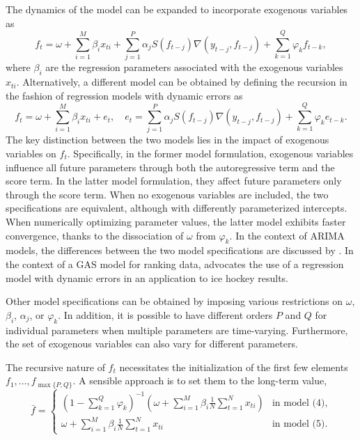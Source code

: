The dynamics of the model can be expanded to incorporate exogenous variables as
\begin{equation}
f_{t} = \omega + \sum_{i=1}^M \beta_i x_{ti} + \sum_{j=1}^P \alpha_j S(f_{t - j}) \nabla(y_{t - j}, f_{t - j}) + \sum_{k=1}^Q \varphi_k f_{t-k},
\label{eq:dynJoint}
\end{equation}
where \(\beta_i\) are the regression parameters associated with the exogenous variables \(x_{ti}\). Alternatively, a different model can be obtained by defining the recursion in the fashion of regression models with dynamic errors as
\begin{equation}
f_{t} = \omega + \sum_{i=1}^M \beta_i x_{ti} + e_{t}, \quad e_t = \sum_{j=1}^P \alpha_j S(f_{t - j}) \nabla(y_{t - j}, f_{t - j}) + \sum_{k=1}^Q \varphi_k e_{t-k}.
\label{eq:dynSep}
\end{equation}
The key distinction between the two models lies in the impact of exogenous variables on \(f_t\). Specifically, in the former model formulation, exogenous variables influence all future parameters through both the autoregressive term and the score term. In the latter model formulation, they affect future parameters only through the score term. When no exogenous variables are included, the two specifications are equivalent, although with differently parameterized intercepts. When numerically optimizing parameter values, the latter model exhibits faster convergence, thanks to the dissociation of \(\omega\) from \(\varphi_k\). In the context of ARIMA models, the differences between the two model specifications are discussed by \citet{Hyndman2010}. In the context of a GAS model for ranking data, \citet{Holy2025a} advocates the use of a regression model with dynamic errors in an application to ice hockey results.

Other model specifications can be obtained by imposing various restrictions on \(\omega\), \(\beta_i\), \(\alpha_j\), or \(\varphi_k\). In addition, it is possible to have different orders \(P\) and \(Q\) for individual parameters when multiple parameters are time-varying. Furthermore, the set of exogenous variables can also vary for different parameters.

The recursive nature of \(f_t\) necessitates the initialization of the first few elements \(f_1, \ldots, f_{\max\{P,Q\}}\). A sensible approach is to set them to the long-term value,
\begin{equation}
\bar{f} = \begin{cases}
\left(1 - \sum_{k=1}^Q \varphi_k \right)^{-1} \left(\omega + \sum_{i=1}^M \beta_i \frac{1}{N} \sum_{t=1}^N x_{ti} \right) & \text{in model (4)}, \\
\omega + \sum_{i=1}^M \beta_i \frac{1}{N} \sum_{t=1}^N x_{ti} & \text{in model (5)}.
\label{eq:init}
\end{cases}
\end{equation}

